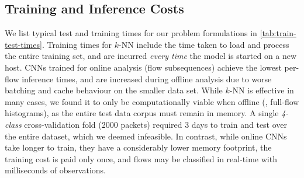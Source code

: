 \subsection{Training and Inference Costs}
\begin{table}[]
    \centering
    \caption{Training and inference costs on our test server.}
    \label{tab:train-test-times}
    \vspace{-0.65cm}
\end{table}

We list typical test and training times for our problem formulations in \cref{tab:train-test-times}.
Training times for $k$-NN include the time taken to load and process the entire training set, and are incurred \emph{every time} the model is started on a new host.
CNNs trained for online analysis (flow subsequences) achieve the lowest per-flow inference times, and are increased during offline analysis due to worse batching and cache behaviour on the smaller data set.
While $k$-NN is effective in many cases, we found it to only be computationally viable when offline (\ie, full-flow histograms), as the entire test data corpus must remain in memory.
A single \emph{4-class} cross-validation fold (\num{2000} packets) required 3 days to train and test over the entire dataset, which we deemed infeasible.
In contrast, while online CNNs take longer to train, they have a considerably lower memory footprint, the training cost is paid only once, and flows may be classified in real-time with milliseconds of observations.

